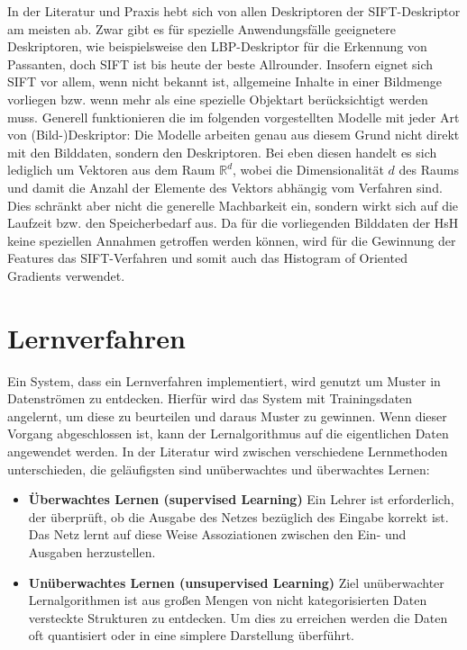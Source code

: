 In der Literatur und Praxis hebt sich von allen Deskriptoren der SIFT-Deskriptor am meisten ab. Zwar gibt es für spezielle Anwendungsfälle geeignetere Deskriptoren, wie beispielsweise den LBP-Deskriptor für die Erkennung von Passanten, doch SIFT ist bis heute der beste \glqq Allrounder\grqq. Insofern eignet sich SIFT vor allem, wenn nicht bekannt ist, allgemeine Inhalte in einer Bildmenge vorliegen bzw. wenn mehr als eine spezielle Objektart berücksichtigt werden muss. Generell funktionieren die im folgenden vorgestellten Modelle mit jeder Art von (Bild-)Deskriptor: Die Modelle arbeiten genau aus diesem Grund nicht direkt mit den Bilddaten, sondern den Deskriptoren. Bei eben diesen handelt es sich lediglich um Vektoren aus dem Raum $\mathbb{R}^d$, wobei die Dimensionalität $d$ des Raums und damit die Anzahl der Elemente des Vektors abhängig vom Verfahren sind. Dies schränkt aber nicht die generelle Machbarkeit ein, sondern wirkt sich auf die Laufzeit bzw. den Speicherbedarf aus. Da für die vorliegenden Bilddaten der HsH keine speziellen Annahmen getroffen werden können, wird für die Gewinnung der Features das SIFT-Verfahren und somit auch das Histogram of Oriented Gradients verwendet. 

\section{Lernverfahren}

Ein System, dass ein Lernverfahren implementiert, wird genutzt um Muster in Datenströmen zu entdecken. Hierfür wird das System mit Trainingsdaten angelernt, um diese zu beurteilen und daraus Muster zu gewinnen. Wenn dieser Vorgang abgeschlossen ist, kann der Lernalgorithmus auf die eigentlichen Daten angewendet werden. In der Literatur wird zwischen verschiedene Lernmethoden unterschieden, die geläufigsten sind unüberwachtes und überwachtes Lernen:

\begin{itemize}
	\item \textbf{Überwachtes Lernen (supervised Learning)} Ein Lehrer ist erforderlich, der überprüft, ob die Ausgabe des Netzes bezüglich des Eingabe korrekt ist. Das Netz lernt auf diese Weise Assoziationen zwischen den Ein- und Ausgaben herzustellen.
	\item \textbf{Unüberwachtes Lernen (unsupervised Learning)} Ziel unüberwachter Lernalgorithmen ist aus großen Mengen von nicht kategorisierten Daten versteckte Strukturen zu entdecken. Um dies zu erreichen werden die Daten oft quantisiert oder in eine simplere Darstellung überführt.
\end{itemize}

